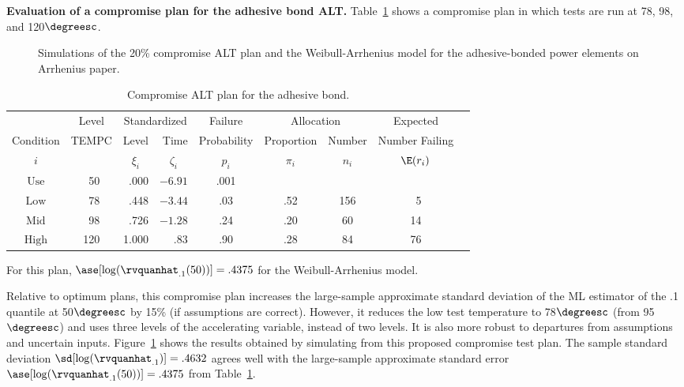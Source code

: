 \begin{example}
{\bf Evaluation of a compromise plan for the adhesive bond ALT.} 
Table~\ref{table:alt.plan.comp.plan} shows a
compromise plan in which tests are run at 78, 98, and 120$\degreesc$.
\begin{figure}
\caption{Simulations of the 20\% compromise ALT 
plan and the Weibull-Arrhenius model for the adhesive-bonded power
elements on Arrhenius paper.}
\label{figure:advbond.plan3.sim.ps}
\end{figure}
\begin{table}
\caption{Compromise ALT plan for the adhesive bond.}
\centering\small
\begin{tabular}{ccrrccccc}
\\[-.5ex]
\hline
     &
Level&  \multicolumn{2}{c}{Standardized} &Failure & \multicolumn{2}{c}{Allocation}  & Expected    \\ \cline {3-4} \cline{6-7}
Condition&TEMPC &  Level& Time &   Probability & Proportion & Number & Number Failing\\
$i$ & & \multicolumn{1}{c}{$\xi_{i}$} & \multicolumn{1}{c}{$\zeta_{i}$}&  $p_{i}$  & $\pi_{i}$ &$n_{i}$& $\E(r_{i})$ \\
\hline
$\mbox{Use}$& \mbox{ 50}&.000 &$-6.91$ & .001  &   &   &           \\
$\mbox{Low}$& \mbox{ 78}&.448 &$-3.44$ &.03    & .52   & 156  & \mbox{ 5} \\
$\mbox{Mid}$& \mbox{ 98}&.726 &$-1.28$ &.24    & .20   &  60  & \mbox{14} \\
$\mbox{High}$& \mbox{120}&1.000&$.83 $ &.90    & .28   & 84   &  \mbox{76} \\
\hline
\end{tabular}
\begin{minipage}[t]{4in}
For this plan, $\ase[\log(\rvquanhat_{.1}(50))]= .4375 $ for the Weibull-Arrhenius
model.
\end{minipage}
\label{table:alt.plan.comp.plan}
\end{table}
Relative to optimum plans, this compromise plan increases the
large-sample approximate standard deviation of the ML estimator of
the .1 quantile at 50$\degreesc$ by 15\% (if assumptions are
correct).  However, it reduces the low test temperature to
78$\degreesc$ (from 95$\degreesc$) and uses three levels of the
accelerating variable, instead of two levels.  It is also more
robust to departures from assumptions and uncertain inputs.
Figure~\ref{figure:advbond.plan3.sim.ps} shows the results obtained
by simulating from this proposed compromise test plan. The sample
standard deviation $\sd[\log(\rvquanhat_{.1})]=.4632$ agrees well
with the large-sample approximate standard error
$\ase[\log(\rvquanhat_{.1}(50))]= .4375 $ from
Table~\ref{table:alt.plan.comp.plan}.
\end{example}
	

